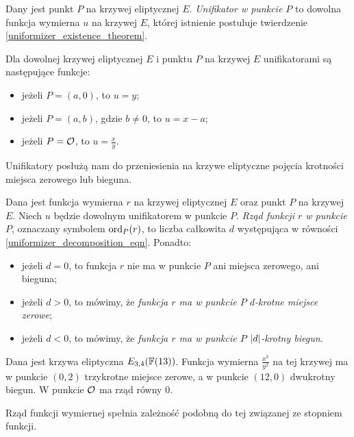 \begin{definition}
Dany jest punkt $P$ na krzywej eliptycznej $E$.
\emph{Unifikator w punkcie $P$}
to dowolna funkcja wymierna $u$ na krzywej $E$,
której istnienie postuluje twierdzenie \ref{uniformizer_existence_theorem}.
\end{definition}

\begin{example}
Dla dowolnej krzywej eliptycznej $E$ i punktu $P$ na krzywej $E$
unifikatorami są następujące funkcje:
\begin{itemize}
\item jeżeli $P = (a, 0)$, to $u = y$;
\item jeżeli $P = (a, b)$, gdzie $b \neq 0$, to $u = x - a$;
\item jeżeli $P = \mathcal{O}$, to $u = \frac{x}{y}$.
\end{itemize}
\end{example}

\noindent
Unifikatory posłużą nam do przeniesienia na krzywe eliptyczne
pojęcia krotności miejsca zerowego lub bieguna.

\begin{definition}
Dana jest funkcja wymierna $r$ na krzywej eliptycznej $E$
oraz punkt $P$ na krzywej $E$.
Niech $u$ będzie dowolnym unifikatorem w punkcie $P$.
\emph{Rząd funkcji $r$ w punkcie $P$},
oznaczany symbolem $\operatorname{ord}_P(r)$,
to liczba całkowita $d$
występująca w równości \ref{uniformizer_decomposition_eqn}.
Ponadto:
\begin{itemize}
\item jeżeli $d = 0$,
to funkcja $r$ nie ma w punkcie $P$ ani miejsca zerowego, ani bieguna;
\item jeżeli $d > 0$, to mówimy,
że \emph{funkcja $r$ ma w punkcie $P$ $d$-krotne miejsce zerowe};
\item jeżeli $d < 0$, to mówimy,
że \emph{funkcja $r$ ma w punkcie $P$ $\lvert d\rvert$-krotny biegun}.
\end{itemize}
\end{definition}

\begin{example}
Dana jest krzywa eliptyczna $E_{3, 4}(\mathbb{F}(13))$.
Funkcja wymierna $\frac{x^3}{y^2}$ na tej krzywej
ma w punkcie $(0, 2)$ trzykrotne miejsce zerowe,
a w punkcie $(12, 0)$ dwukrotny biegun.
W punkcie $\mathcal{O}$ ma rząd równy $0$.
\end{example}

\noindent
Rząd funkcji wymiernej spełnia zależność
podobną do tej związanej ze stopniem funkcji.

